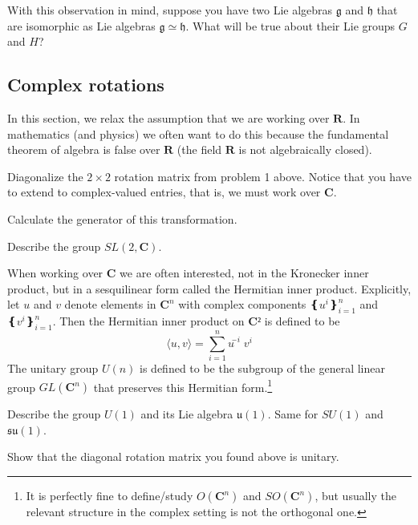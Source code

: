 \begin{exercise}
\label{localiso}
With this observation in mind, suppose you have two Lie algebras $𝔤$ and $𝔥$ that are isomorphic as Lie algebras $𝔤 ≃ 𝔥$. What will be true about their Lie groups $G$ and $H$?
\end{exercise}



\subsection{Complex rotations}

In this section, we relax the assumption that we are working over $𝐑$. In mathematics (and physics) we often want to do this because the fundamental theorem of algebra is false over $𝐑$ (the field $𝐑$ is not algebraically closed).

\begin{exercise}
Diagonalize the $2 × 2$ rotation matrix from problem 1 above. Notice that you have to extend to complex-valued entries, that is, we must work over $𝐂$. 
\end{exercise}

\begin{exercise}
\label{L3}
Calculate the generator of this transformation. 
\end{exercise}

\begin{exercise}
Describe the group $SL(2, 𝐂)$. 
\end{exercise}

When working over $𝐂$ we are often interested, not in the Kronecker inner product, but in a sesquilinear form called the Hermitian inner product. Explicitly, let $u$ and $v$ denote elements in $𝐂^n$ with complex components $❴ u^i ❵_{i=1}^n$ and $❴v^i❵_{i=1}^n$. Then the Hermitian inner product on $𝐂²$ is defined to be
$$
\langle u, v \rangle = ∑_{i=1}^n ū^i v^i
$$
The unitary group $U(n)$ is defined to be the subgroup of the general linear group $GL(𝐂^n)$ that preserves this Hermitian form.\footnote{It is perfectly fine to define/study $O(𝐂^n)$ and $SO(𝐂^n)$, but usually the relevant structure in the complex setting is not the orthogonal one.}

\begin{exercise}
Describe the group $U(1)$ and its Lie algebra $𝔲(1)$. 
Same for $SU(1)$ and $𝔰𝔲(1)$.  
\end{exercise}

\begin{exercise}
Show that the diagonal rotation matrix you found above is unitary. 
\end{exercise}

